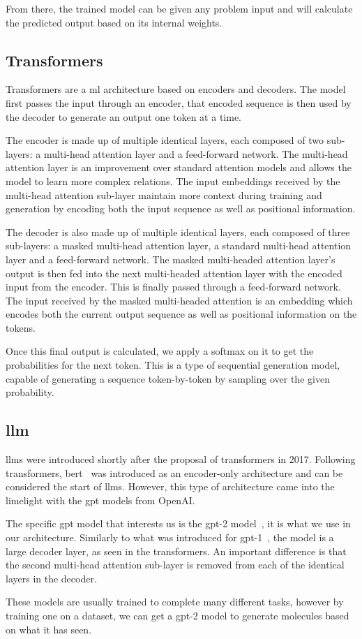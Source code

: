 \documentclass[../Document.tex]{subfiles}
\begin{document}
From there, the trained model can be given any problem input and will calculate the predicted output based on its internal weights.


\subsection{Transformers}
Transformers\cite{vaswani2017attention} are a \gls{ml} architecture based on encoders and decoders. The model first passes the input through an encoder, that encoded sequence is then used by the decoder to generate an output one token at a time.

The encoder is made up of multiple identical layers, each composed of two sub-layers: a multi-head attention layer and a feed-forward network.
The multi-head attention layer is an improvement over standard attention models and allows the model to learn more complex relations.
The input embeddings received by the multi-head attention sub-layer maintain more context during training and generation by encoding both the input sequence as well as positional information.

The decoder is also made up of multiple identical layers, each composed of three sub-layers: a masked multi-head attention layer, a standard multi-head attention layer and a feed-forward network.
The masked multi-headed attention layer's output is then fed into the next multi-headed attention layer with the encoded input from the encoder. This is finally passed through a feed-forward network.
The input received by the masked multi-headed attention is an embedding which encodes both the current output sequence as well as positional information on the tokens.

Once this final output is calculated, we apply a softmax on it to get the probabilities for the next token. This is a type of sequential generation model, capable of generating a sequence token-by-token by sampling over the given probability.


\subsection{\acrlong{llm}}
\glspl{llm} were introduced shortly after the proposal of transformers in 2017. Following transformers, \gls{bert}~\cite{devlin2019bert} was introduced as an encoder-only architecture and can be considered the start of \glspl{llm}. However, this type of architecture came into the limelight with the \gls{gpt} models from OpenAI.

The specific \gls{gpt} model that interests us is the \gls{gpt}-2 model~\cite{radford2019language}, it is what we use in our architecture. Similarly to what was introduced for \gls{gpt}-1~\cite{radford2018improving}, the model is a large decoder layer, as seen in the transformers.
An important difference is that the second multi-head attention sub-layer is removed from each of the identical layers in the decoder.

These models are usually trained to complete many different tasks, however by training one on a \smiles dataset, we can get a \gls{gpt}-2 model to generate molecules based on what it has seen.
\end{document}
